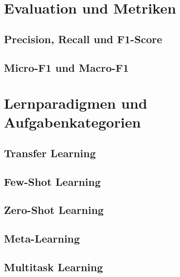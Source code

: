 \section{Evaluation und Metriken}
\label{sec:evaluation-metrics}

\subsection{Precision, Recall und F1-Score}
\label{subsec:precision-recall-f1}

\subsection{Micro-F1 und Macro-F1}
\label{subsec:micro-macro-f1}

\section{Lernparadigmen und Aufgabenkategorien}
\label{sec:lernparadigmen-aufgabenkategorien}

\subsection{Transfer Learning}
\label{subsec:transfer-learning}

\subsection{Few-Shot Learning}
\label{subsec:few-shot-learning}

\subsection{Zero-Shot Learning}
\label{subsec:zero-shot-learning}

\subsection{Meta-Learning}
\label{subsec:meta-learning}

\subsection{Multitask Learning}
\label{subsec:multitask-learning}
